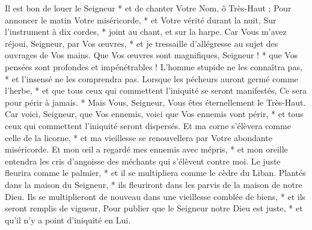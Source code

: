 Il est bon de louer le Seigneur * et de chanter Votre Nom, ô Très-Haut ;
\versseparator
Pour annoncer le matin Votre miséricorde, * et Votre vérité durant la nuit,
\versseparator
Sur l'instrument à dix cordes, * joint au chant, et sur la harpe.
\versseparator
Car Vous m'avez réjoui, Seigneur, par Vos œuvres, * et je tressaille d'allégresse au sujet des ouvrages de Vos mains.
\versseparator
Que Vos œuvres sont magnifiques, Seigneur ! * que Vos pensées sont profondes et impénétrables !
\versseparator
L'homme stupide ne les connaîtra pas, * et l'insensé ne les comprendra pas.
\versseparator
Lorsque les pécheurs auront germé comme l'herbe, * et que tous ceux qui commettent l'iniquité se seront manifestés,
\versseparator
Ce sera pour périr à jamais. * Mais Vous, Seigneur, Vous êtes éternellement le Très-Haut.
\versseparator
Car voici, Seigneur, que Vos ennemis, voici que Vos ennemis vont périr, * et tous ceux qui commettent l'iniquité seront dispersés.
\versseparator
Et ma corne s'élèvera comme celle de la licorne, * et ma vieillesse se renouvellera par Votre abondante miséricorde.
\versseparator
Et mon œil a regardé mes ennemis avec mépris, * et mon oreille entendra les cris d'angoisse des méchants qui s'élèvent contre moi.
\versseparator
Le juste fleurira comme le palmier, * et il se multipliera comme le cèdre du Liban.
\versseparator
Plantés dans la maison du Seigneur, * ils fleuriront dans les parvis de la maison de notre Dieu.
\versseparator
Ils se multiplieront de nouveau dans une vieillesse comblée de biens, * et ils seront remplis de vigueur,
\versseparator
Pour publier que le Seigneur notre Dieu est juste, * et qu'il n'y a point d'iniquité en Lui.